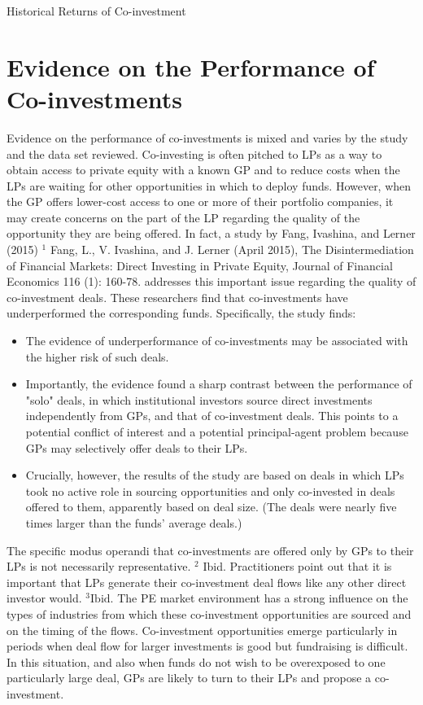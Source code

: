 \documentclass[11pt]{article}
\begin{document}
Historical Returns of Co-investment

\section*{Evidence on the Performance of Co-investments}
Evidence on the performance of co-investments is mixed and varies by the study and the data set reviewed. Co-investing is often pitched to LPs as a way to obtain access to private equity with a known GP and to reduce costs when the LPs are waiting for other opportunities in which to deploy funds. However, when the GP offers lower-cost access to one or more of their portfolio companies, it may create concerns on the part of the LP regarding the quality of the opportunity they are being offered. In fact, a study by Fang, Ivashina, and Lerner (2015) ${ }^{1}$ Fang, L., V. Ivashina, and J. Lerner (April 2015), The Disintermediation of Financial Markets: Direct Investing in Private Equity, Journal of Financial Economics 116 (1): 160-78. addresses this important issue regarding the quality of co-investment deals. These researchers find that co-investments have underperformed the corresponding funds. Specifically, the study finds:

\begin{itemize}
  \item The evidence of underperformance of co-investments may be associated with the higher risk of such deals.
  \item Importantly, the evidence found a sharp contrast between the performance of "solo" deals, in which institutional investors source direct investments independently from GPs, and that of co-investment deals. This points to a potential conflict of interest and a potential principal-agent problem because GPs may selectively offer deals to their LPs.
  \item Crucially, however, the results of the study are based on deals in which LPs took no active role in sourcing opportunities and only co-invested in deals offered to them, apparently based on deal size. (The deals were nearly five times larger than the funds' average deals.)
\end{itemize}

The specific modus operandi that co-investments are offered only by GPs to their LPs is not necessarily representative. ${ }^{2}$ Ibid. Practitioners point out that it is important that LPs generate their co-investment deal flows like any other direct investor would. ${ }^{3} \mathrm{Ibid}$. The PE market environment has a strong influence on the types of industries from which these co-investment opportunities are sourced and on the timing of the flows. Co-investment opportunities emerge particularly in periods when deal flow for larger investments is good but fundraising is difficult. In this situation, and also when funds do not wish to be overexposed to one particularly large deal, GPs are likely to turn to their LPs and propose a co-investment.
\end{document}
